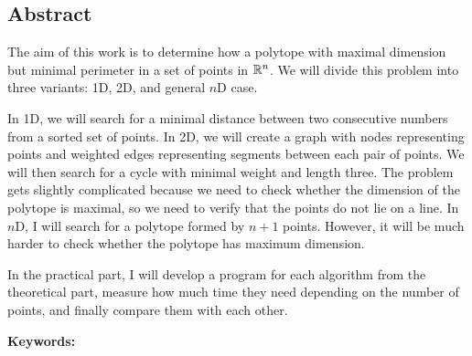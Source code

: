 \subsection*{Abstract}

The aim of this work is to determine how a polytope with maximal dimension but minimal perimeter in a set of points in $\mathbb{R}^n$. We will divide this problem into three variants: 1D, 2D, and general $n$D case. 

In 1D, we will search for a minimal distance between two consecutive numbers from a sorted set of points. In 2D, we will create a graph with nodes representing points and weighted edges representing segments between each pair of points. We will then search for a cycle with minimal weight and length three. The problem gets slightly complicated because we need to check whether the dimension of the polytope is maximal, so we need to verify that the points do not lie on a line. In $n$D, I will search for a polytope formed by $n+1$ points. However, it will be much harder to check whether the polytope has maximum dimension.

In the practical part, I will develop a program for each algorithm from the theoretical part, measure how much time they need depending on the number of points, and finally compare them with each other.

\vspace{1em}
\noindent
\textbf{Keywords: }\keywordsen

